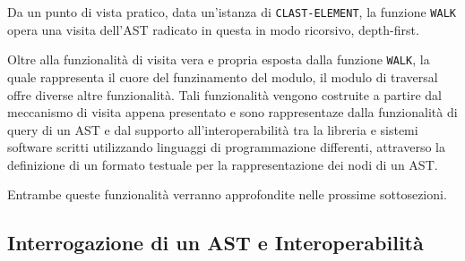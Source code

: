 Da un punto di vista pratico, data un'istanza di \texttt{CLAST-ELEMENT}, la
funzione \texttt{WALK} opera una visita dell'AST radicato in questa in modo
ricorsivo, depth-first.


Oltre alla funzionalità di visita vera e propria esposta dalla funzione
\texttt{WALK}, la quale rappresenta il cuore del funzinamento del modulo, il
modulo di traversal offre diverse altre funzionalità. Tali funzionalità
vengono costruite a partire dal meccanismo di visita appena presentato e sono
rappresentaze dalla funzionalità di query di un AST e dal supporto
all'interoperabilità tra la libreria e sistemi software scritti utilizzando
linguaggi di programmazione differenti, attraverso la definizione di un
formato testuale per la rappresentazione dei nodi di un AST.

Entrambe queste funzionalità verranno approfondite nelle prossime
sottosezioni.

\subsection{Interrogazione di un AST e Interoperabilità}







